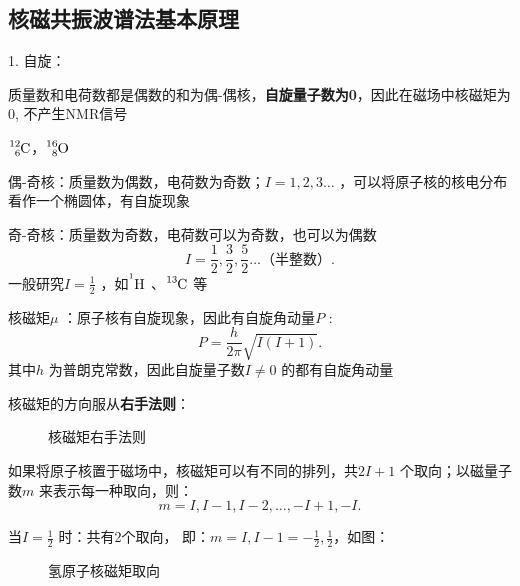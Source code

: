 \subsection{核磁共振波谱法基本原理}%
\label{sub:核磁共振波谱法基本原理}
1. 自旋：
\begin{notation}
    质量数和电荷数都是偶数的和为偶-偶核，\textbf{自旋量子数为0}，因此在磁场中核磁矩为0, 不产生NMR信号
\end{notation}
\begin{eg}
    $\ce{^{12}_{6}C}$，$\ce{^{16}_{8}O}$
\end{eg}
\begin{notation}
    偶-奇核：质量数为偶数，电荷数为奇数；$I=1,2,3\ldots $ ，可以将原子核的核电分布看作一个椭圆体，有自旋现象
\end{notation}
\begin{notation}
    奇-奇核：质量数为奇数，电荷数可以为奇数，也可以为偶数
    \[
        I = \frac{1}{2}, \frac{3}{2}, \frac{5}{2}\ldots \text{（半整数）}
    .\]
    一般研究$I=\frac{1}{2}$ ，如$\ce{^{^1}H}$ 、$\ce{^{13}C}$ 等
\end{notation}
\begin{notation}
    核磁矩$\mu$ ：原子核有自旋现象，因此有自旋角动量$P$ :
    \[
        P = \frac{h}{2\pi }\sqrt{I\left( I+1 \right)}
    .\]
    其中$h$ 为普朗克常数，因此自旋量子数$I\neq 0$ 的都有自旋角动量

    核磁矩的方向服从\textbf{右手法则}：
\begin{figure}[ht!]
    \centering
    \caption{核磁矩右手法则}
    \label{fig:核磁矩右手法则}
\end{figure}
\end{notation}
\begin{notation}
如果将原子核置于磁场中，核磁矩可以有不同的排列，共$2I+1$ 个取向；以磁量子数$m$ 来表示每一种取向，则：\[
    m = I, I-1, I-2, \ldots, -I+1, -I
.\]
\end{notation}
\begin{eg}
    当$I = \frac{1}{2}$ 时：共有2个取向， 即：$m = I, I-1 = -\frac{1}{2},\frac{1}{2}$，如图：
\begin{figure}[ht!]
    \centering
    \caption{氢原子核磁矩取向}
    \label{fig:氢原子核磁矩取向}
\end{figure}
\end{eg}
